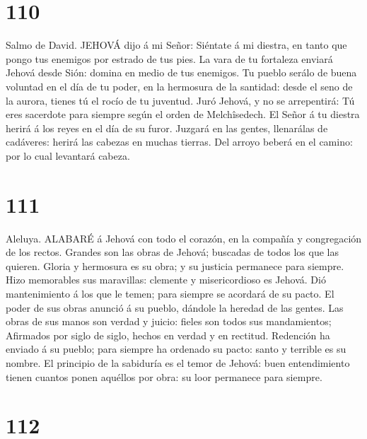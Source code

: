 \hypertarget{section-109}{%
\section{110}\label{section-109}}

 Salmo de David. JEHOVÁ dijo á mi Señor: Siéntate á mi
diestra, en tanto que pongo tus enemigos por estrado de tus pies.
 La vara de tu fortaleza enviará Jehová desde Sión: domina
en medio de tus enemigos.  Tu pueblo serálo de buena
voluntad en el día de tu poder, en la hermosura de la santidad: desde el
seno de la aurora, tienes tú el rocío de tu juventud.  Juró
Jehová, y no se arrepentirá: Tú eres sacerdote para siempre según el
orden de Melchîsedech.  El Señor á tu diestra herirá á los
reyes en el día de su furor.  Juzgará en las gentes,
llenarálas de cadáveres: herirá las cabezas en muchas tierras.
 Del arroyo beberá en el camino: por lo cual levantará
cabeza.

\hypertarget{section-110}{%
\section{111}\label{section-110}}

 Aleluya. ALABARÉ á Jehová con todo el corazón, en la
compañía y congregación de los rectos.  Grandes son las
obras de Jehová; buscadas de todos los que las quieren. 
Gloria y hermosura es su obra; y su justicia permanece para siempre.
 Hizo memorables sus maravillas: clemente y misericordioso
es Jehová.  Dió mantenimiento á los que le temen; para
siempre se acordará de su pacto.  El poder de sus obras
anunció á su pueblo, dándole la heredad de las gentes.  Las
obras de sus manos son verdad y juicio: fieles son todos sus
mandamientos;  Afirmados por siglo de siglo, hechos en
verdad y en rectitud.  Redención ha enviado á su pueblo;
para siempre ha ordenado su pacto: santo y terrible es su nombre.
 El principio de la sabiduría es el temor de Jehová: buen
entendimiento tienen cuantos ponen aquéllos por obra: su loor permanece
para siempre.

\hypertarget{section-111}{%
\section{112}\label{section-111}}


